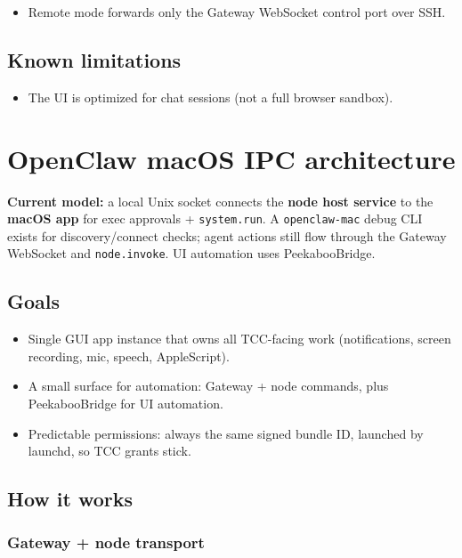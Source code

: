 \begin{itemize}
  \item Remote mode forwards only the Gateway WebSocket control port over SSH.
\end{itemize}


\subsection{Known limitations}


\begin{itemize}
  \item The UI is optimized for chat sessions (not a full browser sandbox).
\end{itemize}



\clearpage

\section{OpenClaw macOS IPC architecture}


\textbf{Current model:} a local Unix socket connects the \textbf{node host service} to the \textbf{macOS app} for exec approvals + \texttt{system.run}. A \texttt{openclaw-mac} debug CLI exists for discovery/connect checks; agent actions still flow through the Gateway WebSocket and \texttt{node.invoke}. UI automation uses PeekabooBridge.

\subsection{Goals}


\begin{itemize}
  \item Single GUI app instance that owns all TCC-facing work (notifications, screen recording, mic, speech, AppleScript).
  \item A small surface for automation: Gateway + node commands, plus PeekabooBridge for UI automation.
  \item Predictable permissions: always the same signed bundle ID, launched by launchd, so TCC grants stick.
\end{itemize}


\subsection{How it works}


\subsubsection{Gateway + node transport}


